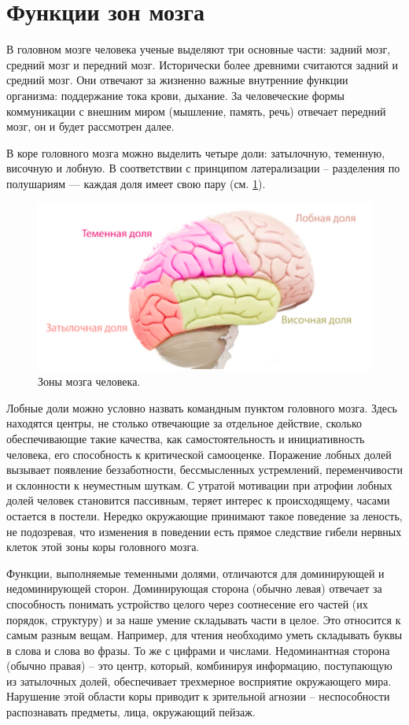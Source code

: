 \documentclass[pdftex,ptm,12pt,a4paper]{report}
\theoremstyle{definition}
\begin{document}
\section{Функции зон мозга} \label{zones_function}

В головном мозге человека ученые выделяют три основные части: задний мозг, средний мозг и передний мозг. Исторически более древними считаются задний и средний мозг. Они отвечают за жизненно важные внутренние функции организма: поддержание тока крови, дыхание. За человеческие формы коммуникации с внешним миром (мышление, память, речь) отвечает передний мозг, он и будет рассмотрен далее.

В коре головного мозга можно выделить четыре доли: затылочную, теменную, височную и лобную. В соответствии с принципом латерализации -- разделения по полушариям — каждая доля имеет свою пару (см. \ref{mozg}).

\begin{figure}[h]
\includegraphics[scale=0.45]{images/mozg.png}
\centering
\caption{Зоны мозга человека.}
\label{mozg}
\end{figure}

Лобные доли можно условно назвать командным пунктом головного мозга. Здесь находятся центры, не столько отвечающие за отдельное действие, сколько обеспечивающие такие качества, как самостоятельность и инициативность человека, его способность к критической самооценке. 
Поражение лобных долей вызывает появление беззаботности, бессмысленных устремлений, переменчивости и склонности к неуместным шуткам. 
С утратой мотивации при атрофии лобных долей человек становится пассивным, теряет интерес к происходящему, часами остается в постели.
Нередко  окружающие принимают такое поведение за леность, 
не подозревая, что изменения в поведении есть прямое следствие гибели 
нервных клеток этой зоны коры головного мозга.

Функции, выполняемые теменными долями, отличаются для доминирующей и недоминирующей сторон. Доминирующая сторона (обычно левая) отвечает за способность понимать устройство целого через соотнесение его частей (их порядок, структуру) и за наше умение складывать части в целое. Это относится к самым разным вещам. Например, для чтения необходимо уметь складывать буквы в слова и слова во фразы. То же с цифрами и числами. Недоминантная сторона (обычно правая) – это центр, который, комбинируя информацию, поступающую из затылочных долей, обеспечивает трехмерное восприятие окружающего мира. Нарушение этой области коры приводит к зрительной агнозии – неспособности распознавать предметы, лица, окружающий пейзаж.
\end{document}
